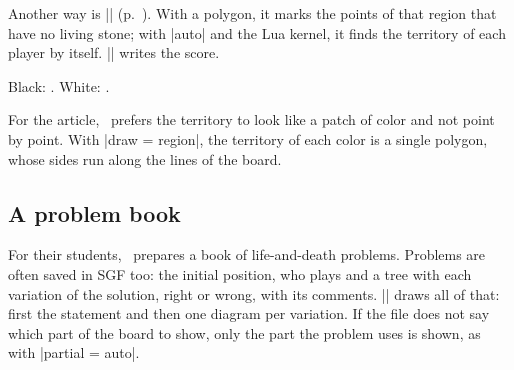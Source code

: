 \begin{goban}
Another way is |\territory| (p.~\pageref{subsec:territorio}). With a polygon, it marks the points of that region that have no living stone; with |auto| and the Lua kernel, it finds the territory of each player by itself. |\pgfgoscore| writes the score.

\begin{codeexample}[width=4.75cm]

	\begin{goban}[label = {at = {above, left}}, resume = final2]
	\end{goban}

	Black: . White: .
\end{codeexample}

For the article, \karu\ prefers the territory to look like a patch of color and not point by point. With |draw = region|, the territory of each color is a single polygon, whose sides run along the lines of the board.

\begin{codeexample}[width=4.75cm]

	\begin{goban}[label = {at = {above, left}}, resume = final2]
	\end{goban}
\end{codeexample}

\subsection{A problem book}
\label{tut:problemas}

For their students, \karu\ prepares a book of life-and-death problems. Problems are often saved in SGF too: the initial position, who plays and a tree with each variation of the solution, right or wrong, with its comments. |\sgfproblem| draws all of that: first the statement and then one diagram per variation. If the file does not say which part of the board to show, only the part the problem uses is shown, as with |partial = auto|.

\begin{codeexample}

\end{codeexample}



\end{goban}
